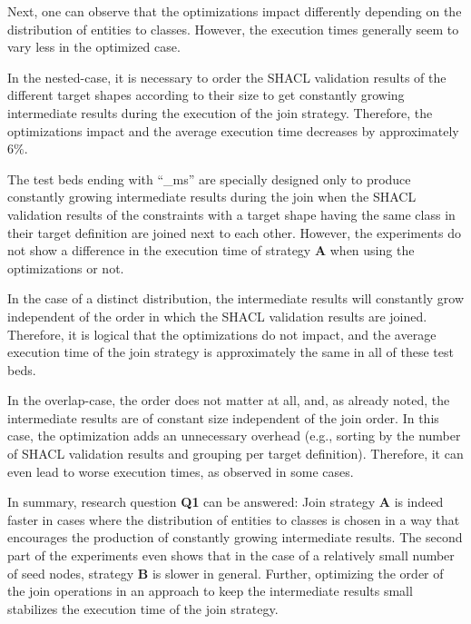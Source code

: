 Next, one can observe that the optimizations impact differently depending on the distribution of entities to classes. However, the execution times generally seem to vary less in the optimized case. 


In the \glqq nested\grqq{}-case, it is necessary to order the SHACL validation results of the different target shapes according to their size to get constantly growing intermediate results during the execution of the join strategy. Therefore, the optimizations impact and the average execution time decreases by approximately $6\%$.

The test beds ending with ``\_ms'' are specially designed only to produce constantly growing intermediate results during the join when the SHACL validation results of the constraints with a target shape having the same class in their target definition are joined next to each other. However, the experiments do not show a difference in the execution time of strategy \textbf{A} when using the optimizations or not.

In the case of a distinct distribution, the intermediate results will constantly grow independent of the order in which the SHACL validation results are joined. Therefore, it is logical that the optimizations do not impact, and the average execution time of the join strategy is approximately the same in all of these test beds.

In the \glqq overlap\grqq{}-case, the order does not matter at all, and, as already noted, the intermediate results are of constant size independent of the join order. In this case, the optimization adds an unnecessary overhead (e.g., sorting by the number of SHACL validation results and grouping per target definition). Therefore, it can even lead to worse execution times, as observed in some cases. 

In summary, research question \textbf{Q1} can be answered: Join strategy \textbf{A} is indeed faster in cases where the distribution of entities to classes is chosen in a way that encourages the production of constantly growing intermediate results. The second part of the experiments even shows that in the case of a relatively small number of seed nodes, strategy \textbf{B} is slower in general. Further, optimizing the order of the join operations in an approach to keep the intermediate results small stabilizes the execution time of the join strategy. 